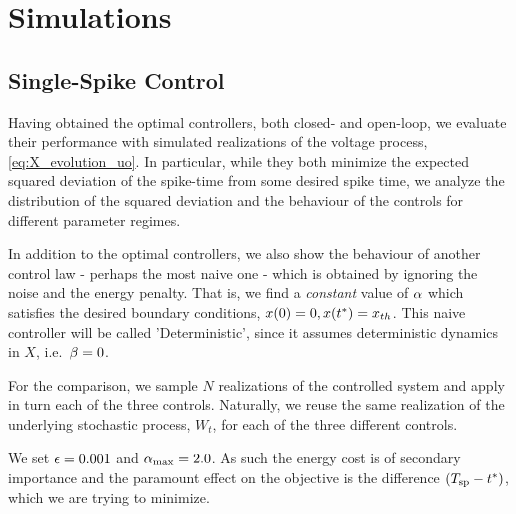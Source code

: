 \documentclass[12pt]{iopart}
\begin{document}

\section{Simulations} 
\subsection{Single-Spike Control}
\label{sec:probabilistic_numerical_test}
Having obtained the optimal controllers, both closed- and open-loop, we evaluate
their performance with simulated realizations of the voltage process,
\cref{eq:X_evolution_uo}. In particular, while they both minimize the expected
squared deviation of the spike-time from some desired spike time, we analyze
the distribution of the squared deviation and the behaviour of the
controls for different parameter regimes.

In addition to the optimal controllers, we also show the behaviour of
another control law - perhaps the most naive one - which is obtained by ignoring
the noise and the energy penalty. That is, we find a {\sl constant} value of
${\alpha}$ which satisfies the desired boundary conditions, $x(0) = 0, x({ t^* }) = { x_{th} }$. This naive
controller will be called 'Deterministic', since it assumes deterministic
dynamics in $X$, i.e.\ ${\beta} = 0$.

For the comparison, we sample $N$ realizations of the controlled system
and apply in turn each of the three controls. Naturally, we reuse the same
realization of the underlying stochastic process, $W_t$, for each of the
three different controls.

We set ${\epsilon} = 0.001$ and ${ {\alpha}_{\textrm{max}} } = 2.0$. As such the energy cost is of secondary
importance and the paramount effect on the objective is the difference $({ T_{\textrm{sp} } } -
{ t^* })$, which we are trying to minimize.
\end{document}
